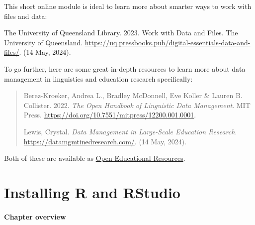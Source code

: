 \documentclass[
  letterpaper,
  DIV=11,
  numbers=noendperiod]{scrreprt}
\begin{document}
\begin{tcolorbox}[enhanced jigsaw, colback=white, colframe=quarto-callout-note-color-frame, coltitle=black, toprule=.15mm, bottomtitle=1mm, arc=.35mm, left=2mm, opacityback=0, leftrule=.75mm, toptitle=1mm, titlerule=0mm, title=\textcolor{quarto-callout-note-color}{\faInfo}\hspace{0.5em}{Going further}, opacitybacktitle=0.6, bottomrule=.15mm, colbacktitle=quarto-callout-note-color!10!white, rightrule=.15mm, breakable]

This short online module is ideal to learn more about smarter ways to
work with files and data:

The University of Queensland Library. 2023. Work with Data and Files.
The University of Queensland.
\url{https://uq.pressbooks.pub/digital-essentials-data-and-files/}. (14
May, 2024).

To go further, here are some great in-depth resources to learn more
about data management in linguistics and education research
specifically:

\begin{quote}
Berez-Kroeker, Andrea L., Bradley McDonnell, Eve Koller \& Lauren B.
Collister. 2022. \emph{The Open Handbook of Linguistic Data Management}.
MIT Press. \url{https://doi.org/10.7551/mitpress/12200.001.0001}.

Lewis, Crystal. \emph{Data Management in Large-Scale Education
Research}. \url{https://datamgmtinedresearch.com/}. (14 May, 2024).
\end{quote}

Both of these are available as
\href{https://elenlefoll.github.io/RstatsTextbook/OpenScholarship.html\#open-education}{Open
Educational Resources}.

\end{tcolorbox}


\chapter{Installing R and RStudio}\label{installing-r-and-rstudio}

\subsubsection*{\texorpdfstring{\textbf{Chapter
overview}}{Chapter overview}}\label{chapter-overview}
\end{document}
